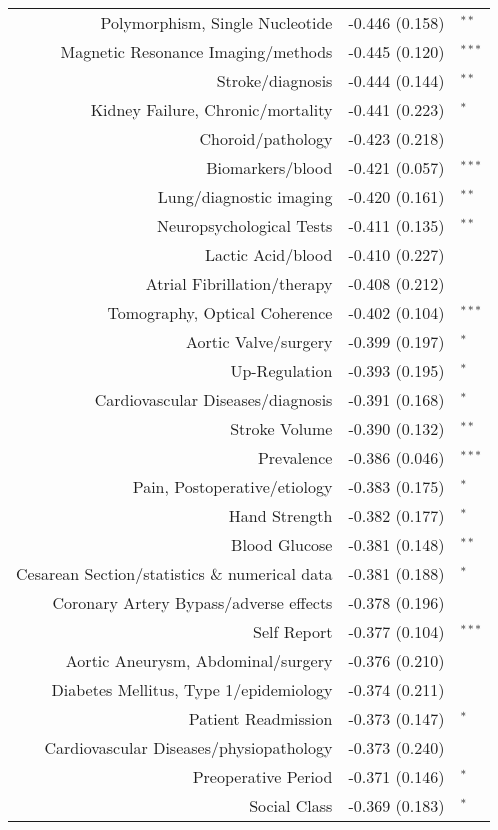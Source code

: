 \begin{longtable}[l]{rr@{}l@{ }}
Polymorphism, Single Nucleotide & -0.446 (0.158) & $^{**}$\\
Magnetic Resonance Imaging/methods & -0.445 (0.120) & $^{***}$\\
Stroke/diagnosis & -0.444 (0.144) & $^{**}$\\
Kidney Failure, Chronic/mortality & -0.441 (0.223) & $^{*}$\\
Choroid/pathology & -0.423 (0.218) & $^{}$\\
Biomarkers/blood & -0.421 (0.057) & $^{***}$\\
Lung/diagnostic imaging & -0.420 (0.161) & $^{**}$\\
Neuropsychological Tests & -0.411 (0.135) & $^{**}$\\
Lactic Acid/blood & -0.410 (0.227) & $^{}$\\
Atrial Fibrillation/therapy & -0.408 (0.212) & $^{}$\\
Tomography, Optical Coherence & -0.402 (0.104) & $^{***}$\\
Aortic Valve/surgery & -0.399 (0.197) & $^{*}$\\
Up-Regulation & -0.393 (0.195) & $^{*}$\\
Cardiovascular Diseases/diagnosis & -0.391 (0.168) & $^{*}$\\
Stroke Volume & -0.390 (0.132) & $^{**}$\\
Prevalence & -0.386 (0.046) & $^{***}$\\
Pain, Postoperative/etiology & -0.383 (0.175) & $^{*}$\\
Hand Strength & -0.382 (0.177) & $^{*}$\\
Blood Glucose & -0.381 (0.148) & $^{**}$\\
Cesarean Section/statistics \& numerical data & -0.381 (0.188) & $^{*}$\\
Coronary Artery Bypass/adverse effects & -0.378 (0.196) & $^{}$\\
Self Report & -0.377 (0.104) & $^{***}$\\
Aortic Aneurysm, Abdominal/surgery & -0.376 (0.210) & $^{}$\\
Diabetes Mellitus, Type 1/epidemiology & -0.374 (0.211) & $^{}$\\
Patient Readmission & -0.373 (0.147) & $^{*}$\\
Cardiovascular Diseases/physiopathology & -0.373 (0.240) & $^{}$\\
Preoperative Period & -0.371 (0.146) & $^{*}$\\
Social Class & -0.369 (0.183) & $^{*}$\\

\end{longtable}
